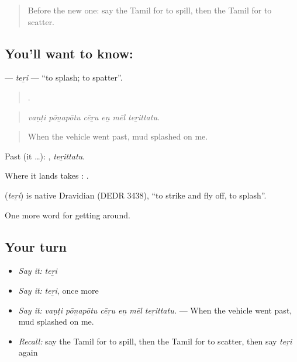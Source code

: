 \label{lesson:TA-C444-teri}



\begin{quote}
Before the new one: say the Tamil for to spill, then the Tamil for to scatter.
\end{quote}

\subsection*{You'll want to know: }
\textbf{} — \emph{teṟi} — \textquotedblleft{}to splash; to spatter\textquotedblright{}.

\begin{quote}
     .
\end{quote}

\begin{quote}
\emph{vaṇṭi pōṉapōtu cēṟu eṉ mēl teṟittatu.}
\end{quote}

\begin{quote}
When the vehicle went past, mud splashed on me.
\end{quote}

Past (it …): , \emph{teṟittatu}.

Where it lands takes :   .

\begin{cousinweb}
\textbf{} (\emph{teṟi}) is native Dravidian (DEDR 3438), \textquotedblleft{}to strike and fly off, to splash\textquotedblright{}.
\end{cousinweb}

\begin{grammarlens}[title={What you've built}]
One more word for getting around.
\end{grammarlens}

\subsection*{Your turn}
\begin{itemize}
\raggedright
  \item \emph{Say it:} \emph{teṟi}
  \item \emph{Say it:} \emph{teṟi}, once more
  \item \emph{Say it:} \emph{vaṇṭi pōṉapōtu cēṟu eṉ mēl teṟittatu.} — When the vehicle went past, mud splashed on me.
  \item \emph{Recall:} say the Tamil for to spill, then the Tamil for to scatter, then say \emph{teṟi} again
\end{itemize}

